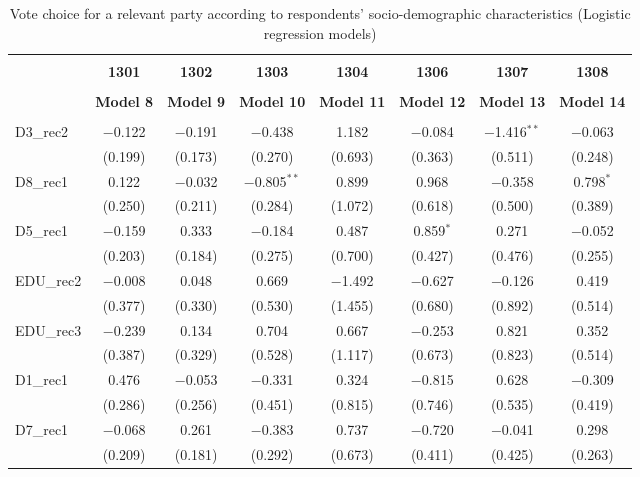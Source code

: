 \documentclass[
]{article}
\begin{document}
\begin{table}[!htbp] \centering 
  \caption{Vote choice for a relevant party according to respondents' 
                       socio-demographic characteristics (Logistic regression models)} 
  \label{table:full_logit_hu} 
\begin{tabular}{@{\extracolsep{5pt}}lccccccc} 
\\[-1.8ex]\hline \\[-1.8ex] 
 & \textbf{1301} & \textbf{1302} & \textbf{1303} & \textbf{1304} & \textbf{1306} & \textbf{1307} & \textbf{1308} \\ 
\\[-1.8ex] & \textbf{Model 8} & \textbf{Model 9} & \textbf{Model 10} & \textbf{Model 11} & \textbf{Model 12} & \textbf{Model 13} & \textbf{Model 14}\\ 
\hline \\[-1.8ex] 
 D3\_rec2 & $-$0.122 & $-$0.191 & $-$0.438 & 1.182 & $-$0.084 & $-$1.416$^{**}$ & $-$0.063 \\ 
  & (0.199) & (0.173) & (0.270) & (0.693) & (0.363) & (0.511) & (0.248) \\ 
  D8\_rec1 & 0.122 & $-$0.032 & $-$0.805$^{**}$ & 0.899 & 0.968 & $-$0.358 & 0.798$^{*}$ \\ 
  & (0.250) & (0.211) & (0.284) & (1.072) & (0.618) & (0.500) & (0.389) \\ 
  D5\_rec1 & $-$0.159 & 0.333 & $-$0.184 & 0.487 & 0.859$^{*}$ & 0.271 & $-$0.052 \\ 
  & (0.203) & (0.184) & (0.275) & (0.700) & (0.427) & (0.476) & (0.255) \\ 
  EDU\_rec2 & $-$0.008 & 0.048 & 0.669 & $-$1.492 & $-$0.627 & $-$0.126 & 0.419 \\ 
  & (0.377) & (0.330) & (0.530) & (1.455) & (0.680) & (0.892) & (0.514) \\ 
  EDU\_rec3 & $-$0.239 & 0.134 & 0.704 & 0.667 & $-$0.253 & 0.821 & 0.352 \\ 
  & (0.387) & (0.329) & (0.528) & (1.117) & (0.673) & (0.823) & (0.514) \\ 
  D1\_rec1 & 0.476 & $-$0.053 & $-$0.331 & 0.324 & $-$0.815 & 0.628 & $-$0.309 \\ 
  & (0.286) & (0.256) & (0.451) & (0.815) & (0.746) & (0.535) & (0.419) \\ 
  D7\_rec1 & $-$0.068 & 0.261 & $-$0.383 & 0.737 & $-$0.720 & $-$0.041 & 0.298 \\ 
  & (0.209) & (0.181) & (0.292) & (0.673) & (0.411) & (0.425) & (0.263) \\ 

\end{tabular}
\end{table}
\end{document}
